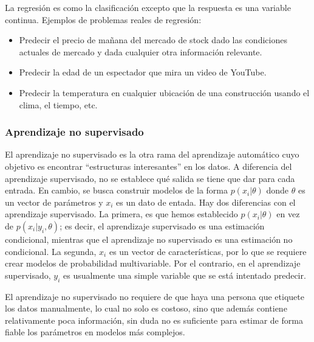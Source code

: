 	
		La regresión es como la clasificación excepto que la respuesta es una variable continua. Ejemplos de problemas reales de regresión:
		\begin{itemize}
			\item Predecir el precio de mañana del mercado de stock dado las condiciones actuales de mercado y dada cualquier otra información relevante.
			\item Predecir la edad de un espectador que mira un video de YouTube.
			\item Predecir la temperatura en cualquier ubicación de una construcción usando el clima, el tiempo, etc.
		\end{itemize}
	
	
	\subsubsection{Aprendizaje no supervisado}
	
		
		El aprendizaje no supervisado es la otra rama del aprendizaje automático cuyo objetivo es encontrar ``estructuras interesantes'' en los datos. A diferencia del aprendizaje supervisado, no se establece qué salida se tiene que dar para cada entrada. En cambio, se busca construir modelos de la forma $p(x_i | \theta)$ donde $\theta$ es un vector de parámetros y $x_i$ es un dato de entada. Hay dos diferencias con el aprendizaje supervisado. La primera, es que hemos establecido $p(x_i | \theta)$ en vez de $p(x_i | y_i, \theta)$; es decir, el aprendizaje supervisado es una estimación condicional, mientras que el aprendizaje no supervisado es una estimación no condicional. La segunda, $x_i$ es un vector de características, por lo que se requiere crear modelos de probabilidad multivariable. Por el contrario, en el aprendizaje supervisado, $y_i$ es usualmente una simple variable que se está intentado predecir.
		
		El aprendizaje no supervisado no requiere de que haya una persona que etiquete los datos manualmente, lo cual no solo es costoso, sino que además contiene relativamente poca información, sin duda no es suficiente para estimar de forma fiable los parámetros en modelos más complejos.
